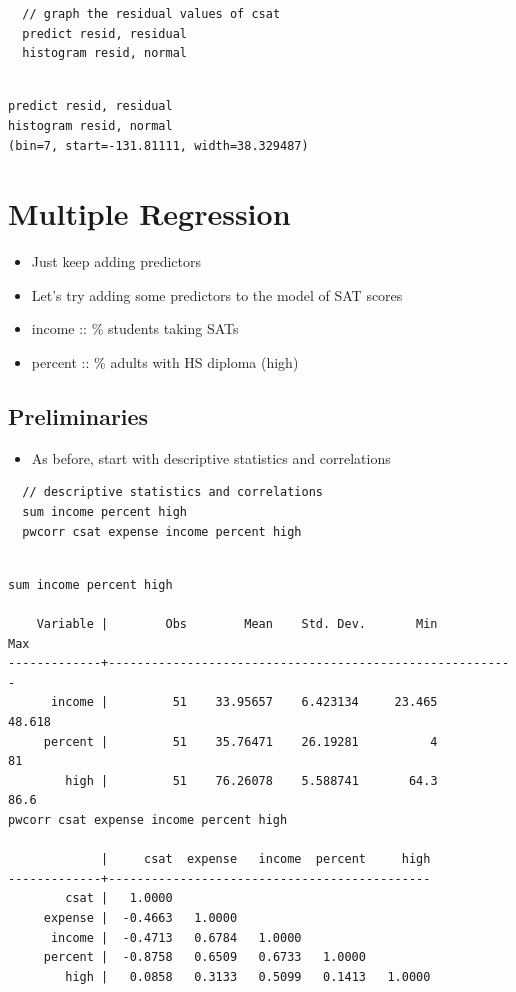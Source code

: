 \documentclass[]{book}
\providecommand{\tightlist}{%
  \setlength{\itemsep}{0pt}\setlength{\parskip}{0pt}}
\begin{document}
\begin{verbatim}
  // graph the residual values of csat
  predict resid, residual
  histogram resid, normal 
\end{verbatim}

\begin{verbatim}

predict resid, residual
histogram resid, normal
(bin=7, start=-131.81111, width=38.329487)
\end{verbatim}

\section{Multiple Regression}\label{multiple-regression}

\begin{itemize}
\tightlist
\item
  Just keep adding predictors
\item
  Let's try adding some predictors to the model of SAT scores
\item
  income :: \% students taking SATs
\item
  percent :: \% adults with HS diploma (high)
\end{itemize}

\subsection{Preliminaries}\label{preliminaries-1}

\begin{itemize}
\tightlist
\item
  As before, start with descriptive statistics and correlations
\end{itemize}

\begin{verbatim}
  // descriptive statistics and correlations
  sum income percent high
  pwcorr csat expense income percent high
\end{verbatim}

\begin{verbatim}

sum income percent high

    Variable |        Obs        Mean    Std. Dev.       Min        Max
-------------+---------------------------------------------------------
      income |         51    33.95657    6.423134     23.465     48.618
     percent |         51    35.76471    26.19281          4         81
        high |         51    76.26078    5.588741       64.3       86.6
pwcorr csat expense income percent high

             |     csat  expense   income  percent     high
-------------+---------------------------------------------
        csat |   1.0000 
     expense |  -0.4663   1.0000 
      income |  -0.4713   0.6784   1.0000 
     percent |  -0.8758   0.6509   0.6733   1.0000 
        high |   0.0858   0.3133   0.5099   0.1413   1.0000
\end{verbatim}
\end{document}
